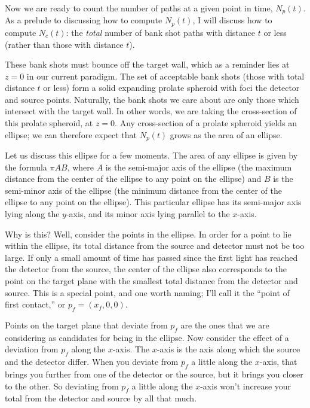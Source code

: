 \documentclass[11pt]{article}
\begin{document}
Now we are ready to count the number of paths at a given point in time, $N_p(t)$. As a prelude to discussing how to compute $N_p(t)$, I will discuss how to compute $N_c(t)$: the \emph{total} number of bank shot paths with distance $t$ or less (rather than those with distance $t$). 

These bank shots must bounce off the target wall, which as a reminder lies at $z=0$ in our current paradigm. The set of acceptable bank shots (those with total distance $t$ or less) form a solid expanding prolate spheroid with foci the detector and source points. Naturally, the bank shots we care about are only those which intersect with the target wall. In other words, we are taking the cross-section of this prolate spheroid, at $z=0$. Any cross-section of a prolate spheroid yields an ellipse; we can therefore expect that $N_p(t)$ grows as the area of an ellipse.

Let us discuss this ellipse for a few moments. The area of any ellipse is given by the formula $\pi A B$, where $A$ is the semi-major axis of the ellipse (the maximum distance from the center of the ellipse to any point on the ellipse) and $B$ is the semi-minor axis of the ellipse (the minimum distance from the center of the ellipse to any point on the ellipse). This particular ellipse has its semi-major axis lying along the $y$-axis, and its minor axis lying parallel to the $x$-axis.

Why is this? Well, consider the points in the ellipse. In order for a point to lie within the ellipse, its total distance from the source and detector must not be too large. If only a small amount of time has passed since the first light has reached the detector from the source, the center of the ellipse also corresponds to the point on the target plane with the smallest total distance from the detector and source. This is a special point, and one worth naming; I'll call it the ``point of first contact,'' or $p_f = (x_f, 0, 0)$. 

Points on the target plane that deviate from $p_f$ are the ones that we are considering as candidates for being in the ellipse. Now consider the effect of a deviation from $p_f$ along the $x$-axis. The $x$-axis is the axis along which the source and the detector differ. When you deviate from $p_f$ a little along the $x$-axis, that brings you further from one of the detector or the source, but it brings you closer to the other. So deviating from $p_f$ a little along the $x$-axis won't increase your total from the detector and source by all that much.
\end{document}
